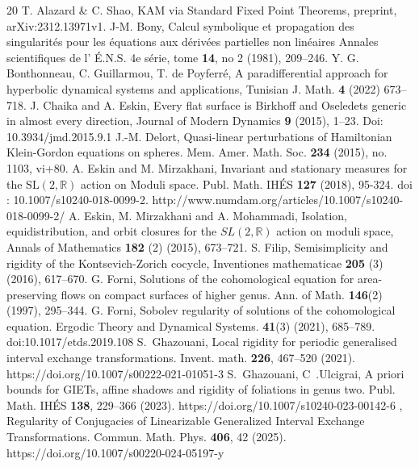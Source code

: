 \documentclass[11pt]{amsart}
\newcommand \R {{ \mathbb R}}
\begin{document}
\begin{thebibliography}{20}
 T. Alazard \& C. Shao,  KAM via Standard Fixed Point Theorems, preprint, arXiv:2312.13971v1.
 J-M. Bony, 
Calcul symbolique et propagation des singularit\'es pour les \'equations aux d\'eriv\'ees partielles non lin\'eaires
Annales scientifiques de l’ \'E.N.S. 4e s\'erie, tome \textbf{14}, no 2 (1981), 209--246.
 Y. G. Bonthonneau, C. Guillarmou, T. de Poyferré, A paradifferential approach for hyperbolic dynamical systems and applications, Tunisian J. Math. \textbf{4} (2022) 673--718.
 J. Chaika and A. Eskin, Every flat surface is Birkhoff and Oseledets generic in almost every direction, Journal of Modern Dynamics
\textbf{9} (2015), 1--23. Doi: 10.3934/jmd.2015.9.1
 J.-M. Delort,  Quasi-linear perturbations of Hamiltonian Klein-Gordon equations on spheres. Mem. Amer. Math. Soc. \textbf{234} (2015), no. 1103, vi+80.
 A. Eskin and M. Mirzakhani,  Invariant and stationary measures for the $\mathrm{SL} (2 , \mathbb{R})$ action on Moduli space. Publ. Math. IH\'ES \textbf{127} (2018), 95-324. doi : 10.1007/s10240-018-0099-2. http://www.numdam.org/articles/10.1007/s10240-018-0099-2/
 A. Eskin, M. Mirzakhani and A. Mohammadi,  Isolation, equidistribution, and orbit closures for the $SL(2,\R)$ action on moduli space, Annals of Mathematics \textbf{182} (2) (2015), 673--721.
 S. Filip, Semisimplicity and rigidity of the Kontsevich-Zorich cocycle,  Inventiones mathematicae \textbf{205} (3) (2016), 617--670.
  G. Forni,  Solutions of the cohomological equation for area-preserving flows on compact surfaces of higher genus. Ann. of Math. \textbf{146}(2) (1997), 295--344.
 G. Forni, Sobolev regularity of solutions of the cohomological equation. Ergodic Theory and Dynamical Systems. \textbf{41}(3) (2021), 685--789. doi:10.1017/etds.2019.108 
 S.~Ghazouani,  Local rigidity for periodic generalised interval exchange transformations. Invent. math. \textbf{226}, 467--520 (2021). https://doi.org/10.1007/s00222-021-01051-3
 S.~Ghazouani, C~.Ulcigrai, A priori bounds for GIETs, affine shadows and rigidity of foliations in genus two. Publ. Math. IH\'ES \textbf{138}, 229--366 (2023). https://doi.org/10.1007/s10240-023-00142-6
 \bysame,  Regularity of Conjugacies of Linearizable Generalized Interval Exchange Transformations. Commun. Math. Phys. \textbf{406}, 42 (2025). https://doi.org/10.1007/s00220-024-05197-y

\end{thebibliography}
\end{document}
